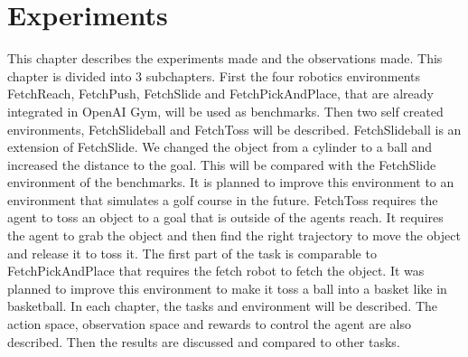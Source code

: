 \chapter{Experiments}

This chapter describes the experiments made and the observations made. This chapter is divided into 3 subchapters.
\newline
First the four robotics environments FetchReach, FetchPush, FetchSlide and FetchPickAndPlace, that are already integrated in OpenAI Gym, will be used as benchmarks.
Then two self created environments, FetchSlideball and FetchToss will be described.
\newline 
FetchSlideball is an extension of FetchSlide. We changed the object from a cylinder to a ball and increased the distance to the goal. This will be compared with the FetchSlide environment of the benchmarks. It is planned to improve this environment to an environment that simulates a golf course in the future.
\newline 
FetchToss requires the agent to toss an object to a goal that is outside of the agents reach. It requires the agent to grab the object and then find the right trajectory to move the object and release it to toss it. The first part of the task is comparable to FetchPickAndPlace that requires the fetch robot to fetch the object. It was planned to improve this environment to make it toss a ball into a basket like in basketball.
\newline
In each chapter, the tasks and environment will be described. The action space, observation space and rewards to control the agent are also described. Then the results are discussed and compared to other tasks.   













